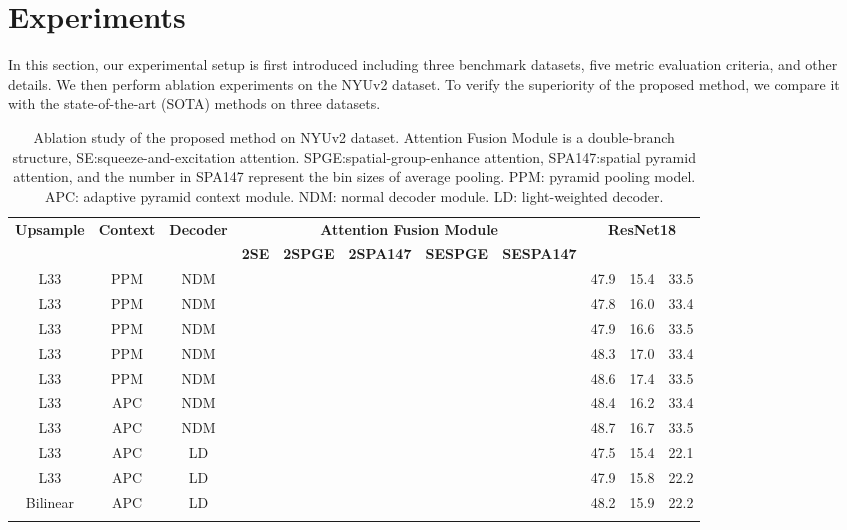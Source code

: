 \documentclass[journal,twoside,web]{ieeecolor}
\begin{document}
\section{Experiments}\label{sec:Experiments}
In this section, our experimental setup is first introduced including three benchmark datasets, five metric evaluation criteria, and other details. We then perform ablation experiments on the NYUv2 dataset. To verify the superiority of the proposed method, we compare it with the state-of-the-art (SOTA) methods on three datasets.
\begin{table*}[!t]
	\centering
	\renewcommand{\arraystretch}{1.2}
	\caption{Ablation study of the proposed method on NYUv2 dataset. Attention Fusion Module is a double-branch structure, SE:squeeze-and-excitation attention. SPGE:spatial-group-enhance attention, SPA147:spatial pyramid attention, and the number in SPA147 represent the bin sizes of average pooling. PPM: pyramid pooling model. APC: adaptive pyramid context module. NDM: normal decoder module. LD: light-weighted decoder.}
	\label{table1}
\footnotesize
	\begin{tabular}{ccccccccccc}
	\toprule \multicolumn{1}{c}{\multirow{2}{*}{\textbf{Upsample}}}&\multirow{2}{*}{\textbf{Context}}	& 	\multirow{2}{*}{\textbf{Decoder}} &
		\multicolumn{5}{c}{\textbf{Attention Fusion Module}}  	&
		\multicolumn{3}{c}{\textbf{ResNet18}} \\
		\cmidrule(r){4-8} \cmidrule(r){9-11}\multicolumn{1}{c}{} & & &\multicolumn{1}{c}{\textbf{\textrm{2SE}}}            			&
		\multicolumn{1}{c}{\textbf{\textrm{2SPGE}}}            			&
		\multicolumn{1}{c}{\textbf{\textrm{2SPA147}}}            		&
		\multicolumn{1}{c}{\textbf{\textrm{SESPGE}}}            		&
		\multicolumn{1}{c}{\textbf{\textrm{SESPA147}}}  &\multicolumn{1}{c}{\textbf{}}&\textbf{} &\textbf{}      \\
    \midrule
		L33& PPM &NDM &\multicolumn{1}{c}{\multirow{1}{*}{}}&  &  &   &  &47.9&15.4 &33.5 \\
		L33& PPM &NDM& &\multicolumn{1}{c}{\multirow{1}{*}{}} &    &    &    &47.8 &16.0 &33.4\\
		L33& PPM &NDM& & &\multicolumn{1}{c}{\multirow{1}{*}{}}&    & &47.9 &16.6&33.5 \\
	    L33&PPM&NDM& & & &\multicolumn{1}{c}{\multirow{1}{*}{}}&    &48.3&17.0&33.4 \\
		L33&PPM&NDM&&&&&\multicolumn{1}{c}{\multirow{1}{*}{}}&48.6&17.4&33.5\\
    \midrule
L33&APC&NDM&&&&\multicolumn{1}{c}{\multirow{1}{*}{}}&    &48.4 &16.2&33.4 \\	
		L33 &APC&NDM& & && &\multicolumn{1}{c}{\multirow{1}{*}{}}&48.7&16.7&33.5\\
    \midrule 
L33&APC&LD&&&&\multicolumn{1}{c}{\multirow{1}{*}{}}&&47.5&15.4&22.1 \\
	  L33&APC&LD&&&&&\multicolumn{1}{c}{\multirow{1}{*}{}}&47.9&15.8&22.2\\
Bilinear &APC&LD&&&& &\multicolumn{1}{c}{\multirow{1}{*}{}}&48.2&15.9&22.2 \\
	\bottomrule
\label{tab:AFM}
	\end{tabular}
\end{table*}
\end{document}
